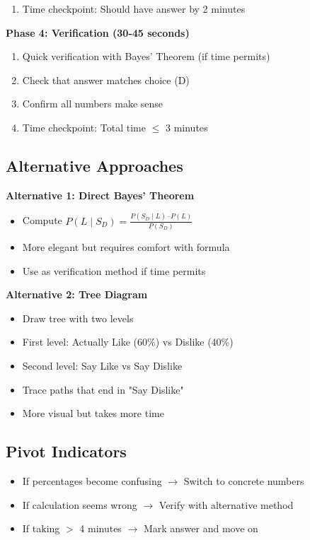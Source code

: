 \documentclass[]{article}
\begin{document}
\begin{solutionbox}
\begin{enumerate}[leftmargin=*]
    \item Time checkpoint: Should have answer by 2 minutes
\end{enumerate}

\textbf{Phase 4: Verification (30-45 seconds)}
\begin{enumerate}[leftmargin=*]
    \item Quick verification with Bayes' Theorem (if time permits)
    \item Check that answer matches choice (D)
    \item Confirm all numbers make sense
    \item Time checkpoint: Total time $\leq$ 3 minutes
\end{enumerate}

\subsection*{Alternative Approaches}

\textbf{Alternative 1: Direct Bayes' Theorem}
\begin{itemize}[leftmargin=*]
    \item Compute $P(L \mid S_D) = \frac{P(S_D \mid L) \cdot P(L)}{P(S_D)}$
    \item More elegant but requires comfort with formula
    \item Use as verification method if time permits
\end{itemize}

\textbf{Alternative 2: Tree Diagram}
\begin{itemize}[leftmargin=*]
    \item Draw tree with two levels
    \item First level: Actually Like (60\%) vs Dislike (40\%)
    \item Second level: Say Like vs Say Dislike
    \item Trace paths that end in "Say Dislike"
    \item More visual but takes more time
\end{itemize}

\subsection*{Pivot Indicators}
\begin{itemize}[leftmargin=*]
    \item If percentages become confusing $\rightarrow$ Switch to concrete numbers
    \item If calculation seems wrong $\rightarrow$ Verify with alternative method
    \item If taking $>$ 4 minutes $\rightarrow$ Mark answer and move on
\end{itemize}


\end{solutionbox}
\end{document}
